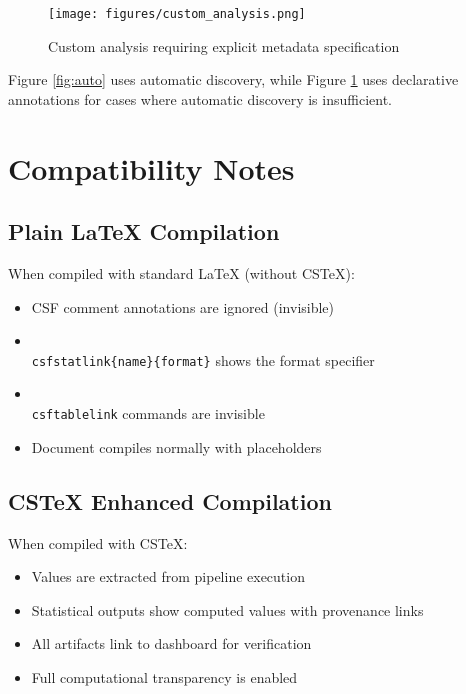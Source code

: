 \documentclass{article}
\begin{document}
\begin{figure}[h]
\centering
\texttt{[image: figures/custom\_analysis.png]}
\caption{Custom analysis requiring explicit metadata specification}
\label{fig:custom}
\end{figure}

Figure \ref{fig:auto} uses automatic discovery, while Figure \ref{fig:custom} uses 
declarative annotations for cases where automatic discovery is insufficient.

\section{Compatibility Notes}

\subsection{Plain LaTeX Compilation}

When compiled with standard LaTeX (without CSTeX):
\begin{itemize}
    \item CSF comment annotations are ignored (invisible)
    \item \texttt{\\csfstatlink\{name\}\{format\}} shows the format specifier
    \item \texttt{\\csftablelink} commands are invisible
    \item Document compiles normally with placeholders
\end{itemize}

\subsection{CSTeX Enhanced Compilation}

When compiled with CSTeX:
\begin{itemize}
    \item Values are extracted from pipeline execution
    \item Statistical outputs show computed values with provenance links
    \item All artifacts link to dashboard for verification
    \item Full computational transparency is enabled
\end{itemize}
\end{document}

